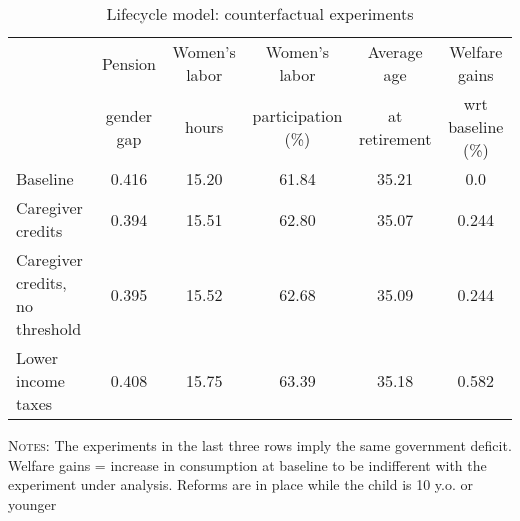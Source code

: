 \begin{table}[htbp]\begin{threeparttable}\caption{Lifecycle model: counterfactual experiments}\label{table:experiments}\centering\footnotesize\begin{tabular}{lccccc} \toprule & Pension & Women's labor & Women's labor & Average age &  Welfare gains  \\&gender gap &hours &  participation  (\%) & at retirement  & wrt baseline (\%)  \\\midrule    Baseline                                   &0.416&15.20&61.84&35.21& 0.0\\ Caregiver credits                          &0.394&15.51&62.80&35.07&0.244\\ Caregiver credits, no threshold            &0.395&15.52&62.68&35.09&0.244\\ Lower income taxes                         &0.408&15.75&63.39&35.18&0.582\\ \bottomrule\end{tabular}\begin{tablenotes}[flushleft]\small\item \textsc{Notes:} The experiments in the last three rows imply the same government deficit. Welfare gains = increase in consumption at baseline to be indifferent with the experiment under analysis. Reforms are in place while the child is 10 y.o. or younger\\\end{tablenotes}\end{threeparttable}\end{table}